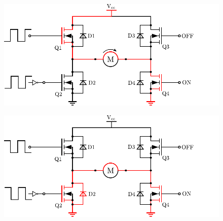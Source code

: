   \begin{minipage}{\linewidth}
  	\begin{minipage}{0.45\linewidth}
  		\begin{figure}[H]
  			\includegraphics[scale=.6]{figures/HbridgeClockwiseBrakeON.pdf}
  			\centering
  			\vspace{-.4cm}
  			\captionsetup{justification=centering}
  			\label{HbridgeClockwiseBrakeON}
  		\end{figure}
  	\end{minipage}
  	\hspace{0.03\linewidth}
  	\begin{minipage}{0.45\linewidth}
  		\begin{figure}[H]
  			\includegraphics[scale=.6]{figures/HbridgeClockwiseBrakeOFF.pdf}
  			\centering
  			\vspace{-.4cm}
  			\captionsetup{justification=centering}
  			\label{HbridgeClockwiseBrakeOFF}
  		\end{figure}
  	\end{minipage}
  \end{minipage}

